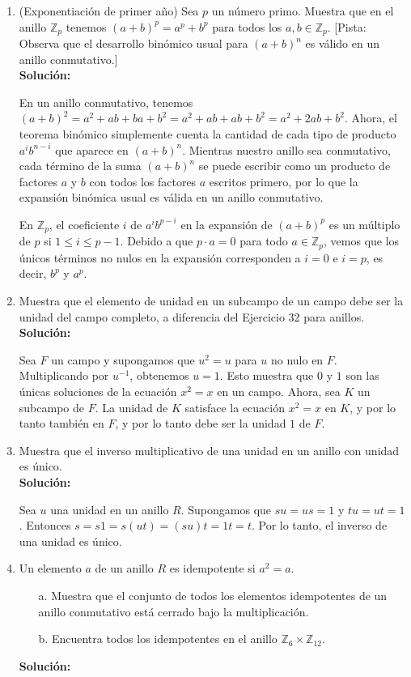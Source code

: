 \begin{enumerate}
	\item (Exponentiación de primer año) Sea $p$ un número primo. Muestra que en el anillo $\mathbb{Z}_p$ tenemos $(a + b)^p = a^p + b^p$ para todos los $a, b \in \mathbb{Z}_p$. [Pista: Observa que el desarrollo binómico usual para $(a + b)^n$ es válido en un anillo conmutativo.]
	\\ \textbf{Solución:}
	
	En un anillo conmutativo, tenemos $(a + b)^2 = a^2 + ab + ba + b^2 = a^2 + ab + ab + b^2 = a^2 + 2ab + b^2$. Ahora, el teorema binómico simplemente cuenta la cantidad de cada tipo de producto $a^ib^{n-i}$ que aparece en $(a + b)^n$. Mientras nuestro anillo sea conmutativo, cada término de la suma $(a + b)^n$ se puede escribir como un producto de factores $a$ y $b$ con todos los factores $a$ escritos primero, por lo que la expansión binómica usual es válida en un anillo conmutativo.
	
	En $\mathbb{Z}_p$, el coeficiente $i$ de $a^ib^{p-i}$ en la expansión de $(a + b)^p$ es un múltiplo de $p$ si $1 \leq i \leq p - 1$. Debido a que $p \cdot a = 0$ para todo $a \in \mathbb{Z}_p$, vemos que los únicos términos no nulos en la expansión corresponden a $i = 0$ e $i = p$, es decir, $b^p$ y $a^p$.
	
	\item Muestra que el elemento de unidad en un subcampo de un campo debe ser la unidad del campo completo, a diferencia del Ejercicio 32 para anillos.
	\\ \textbf{Solución:}
	
	Sea $F$ un campo y supongamos que $u^2 = u$ para $u$ no nulo en $F$. Multiplicando por $u^{-1}$, obtenemos $u = 1$. Esto muestra que $0$ y $1$ son las únicas soluciones de la ecuación $x^2 = x$ en un campo. Ahora, sea $K$ un subcampo de $F$. La unidad de $K$ satisface la ecuación $x^2 = x$ en $K$, y por lo tanto también en $F$, y por lo tanto debe ser la unidad $1$ de $F$.
	
	\item Muestra que el inverso multiplicativo de una unidad en un anillo con unidad es único.
	\\ \textbf{Solución:}
	
	Sea $u$ una unidad en un anillo $R$. Supongamos que $su = us = 1$ y $tu = ut = 1$. Entonces $s = s1 = s(ut) = (su)t = 1t = t$. Por lo tanto, el inverso de una unidad es único.
	
	\item Un elemento $a$ de un anillo $R$ es idempotente si $a^2 = a$.
	\begin{itemize}
		\item[a.] Muestra que el conjunto de todos los elementos idempotentes de un anillo conmutativo está cerrado bajo la multiplicación.
		\item[b.] Encuentra todos los idempotentes en el anillo $\mathbb{Z}_6 \times \mathbb{Z}_{12}$.
	\end{itemize}
	\textbf{Solución:}
	

\end{enumerate}

